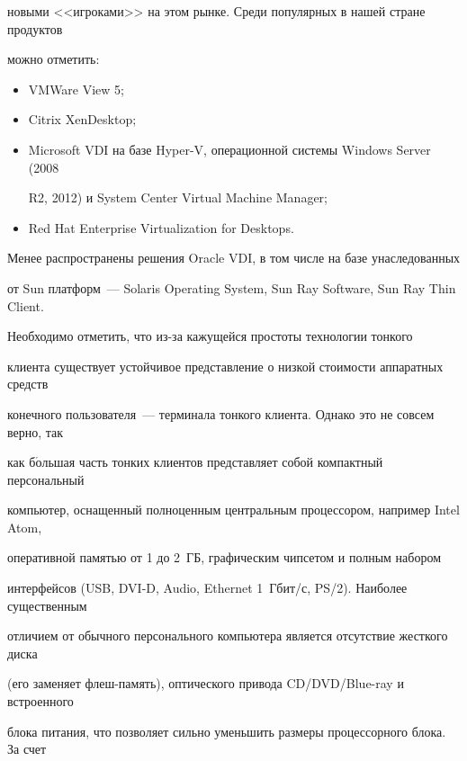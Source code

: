 новыми <<игроками>> на этом рынке. Среди популярных в нашей стране продуктов 


можно отметить:


       \begin{itemize}


       \item VMWare View 5;


       \item Citrix XenDesktop;


       \item Microsoft VDI на базе Hyper-V, операционной системы Windows Server (2008 


R2, 2012) и System Center Virtual Machine Manager;


       \item Red Hat Enterprise Virtualization for Desktops.


       \end{itemize}


       


       Менее распространены решения Oracle VDI, в том числе на базе унаследованных 


от Sun платформ~--- Solaris Operating System, Sun Ray Software, Sun Ray Thin Client.


       


       Необходимо отметить, что из-за кажущейся простоты технологии тонкого 


клиента существует устойчивое представление о низкой стоимости аппаратных средств 


конечного пользователя~--- терминала тонкого клиента. Однако это не совсем верно, так 


как б$\acute{\mbox{о}}$льшая часть тонких клиентов представляет собой компактный персональный 


компьютер, оснащенный полноценным центральным процессором, например Intel Atom, 


оперативной памятью от 1 до 2~ГБ, графическим чипсетом и полным набором 


интерфейсов (USB, DVI-D, Audio, Ethernet 1~Гбит/с, PS/2). Наиболее существенным 


отличием от обычного персонального компьютера является отсутствие жесткого диска 


(его заменяет флеш-па\-мять), оптического привода CD/DVD/Blue-ray и встроенного 


блока питания, что позволяет сильно уменьшить размеры процессорного блока. За счет 


